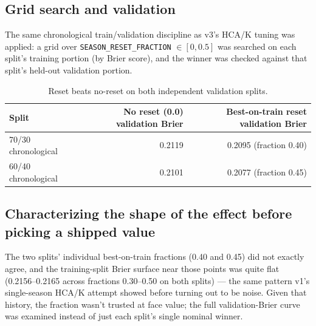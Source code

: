\documentclass[11pt]{article}
\newcommand{\code}[1]{\allowbreak\texttt{\small #1}\allowbreak}
\begin{document}
\subsection{Grid search and validation}

The same chronological train/validation discipline as v3's HCA/K tuning was applied: a grid over
\code{SEASON\_RESET\_FRACTION} $\in [0, 0.5]$ was searched on each split's training portion (by Brier score),
and the winner was checked against that split's held-out validation portion.

\begin{table}[h]
\centering
\begin{tabular}{lrr}
\toprule
Split & No reset (0.0) validation Brier & Best-on-train reset validation Brier \\
\midrule
70/30 chronological & 0.2119 & 0.2095 (fraction 0.40) \\
60/40 chronological & 0.2101 & 0.2077 (fraction 0.45) \\
\bottomrule
\end{tabular}
\caption{Reset beats no-reset on both independent validation splits.}
\end{table}

\subsection{Characterizing the shape of the effect before picking a shipped value}

The two splits' individual best-on-train fractions (0.40 and 0.45) did not exactly agree, and the
training-split Brier surface near those points was quite flat (0.2156–0.2165 across fractions 0.30–0.50 on
both splits) — the same pattern v1's single-season HCA/K attempt showed before turning out to be noise. Given
that history, the fraction wasn't trusted at face value; the full validation-Brier curve was examined instead
of just each split's single nominal winner.
\end{document}

